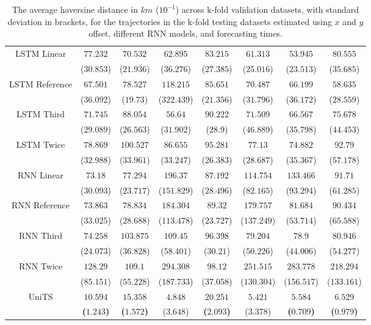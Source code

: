 \begin{table}[!ht]
{\begin{tabular}{|c|c|c|c|c|c|c|c|}
			\multirow{2}{*}{LSTM Linear} & $77.232$ & $70.532$ & $62.895$ & $83.215$ & $61.313$ & $53.945$ & $80.555$ \\
			 & ($30.853$) & ($21.936$) & ($36.276$) & ($27.385$) & ($25.016$) & ($23.513$) & ($35.685$) \\ \hline
			\multirow{2}{*}{LSTM Reference} & $67.501$ & $78.527$ & $118.215$ & $85.651$ & $70.487$ & $66.199$ & $58.635$ \\
			 & ($36.092$) & ($19.73$) & ($322.439$) & ($21.356$) & ($31.796$) & ($36.172$) & ($28.559$) \\ \hline
			\multirow{2}{*}{LSTM Third} & $71.745$ & $88.054$ & $56.64$ & $90.222$ & $71.509$ & $66.567$ & $75.678$ \\
			 & ($29.089$) & ($26.563$) & ($31.902$) & ($28.9$) & ($46.889$) & ($35.798$) & ($44.453$) \\ \hline
			\multirow{2}{*}{LSTM Twice} & $78.869$ & $100.527$ & $86.655$ & $95.281$ & $77.13$ & $74.882$ & $92.79$ \\
			 & ($32.988$) & ($33.961$) & ($33.247$) & ($26.383$) & ($28.687$) & ($35.367$) & ($57.178$) \\ \hline
			\multirow{2}{*}{RNN Linear} & $73.18$ & $77.294$ & $196.37$ & $87.192$ & $114.754$ & $133.466$ & $91.71$ \\
			 & ($30.093$) & ($23.717$) & ($151.829$) & ($28.496$) & ($82.165$) & ($93.294$) & ($61.285$) \\ \hline
			\multirow{2}{*}{RNN Reference} & $73.863$ & $78.834$ & $184.304$ & $89.32$ & $179.757$ & $81.684$ & $90.434$ \\
			 & ($33.025$) & ($28.688$) & ($113.478$) & ($23.727$) & ($137.249$) & ($53.714$) & ($65.588$) \\ \hline
			\multirow{2}{*}{RNN Third} & $74.258$ & $103.875$ & $109.45$ & $96.398$ & $79.204$ & $78.9$ & $80.946$ \\
			 & ($24.073$) & ($36.828$) & ($58.401$) & ($30.21$) & ($50.226$) & ($44.006$) & ($54.277$) \\ \hline
			\multirow{2}{*}{RNN Twice} & $128.29$ & $109.1$ & $294.308$ & $98.12$ & $251.515$ & $283.778$ & $218.294$ \\
			 & ($85.151$) & ($55.228$) & ($187.733$) & ($37.058$) & ($130.304$) & ($156.517$) & ($133.161$) \\ \hline
			\multirow{2}{*}{UniTS} & $\mathbf{10.594}$ & $\mathbf{15.358}$ & $4.848$ & $\mathbf{20.251}$ & $5.421$ & $\mathbf{5.584}$ & $\mathbf{6.529}$ \\
			 & \textbf{(}$\mathbf{1.243}$\textbf{)} & \textbf{(}$\mathbf{1.572}$\textbf{)} & ($3.648$) & \textbf{(}$\mathbf{2.093}$\textbf{)} & ($3.378$) & \textbf{(}$\mathbf{0.709}$\textbf{)} & \textbf{(}$\mathbf{0.979}$\textbf{)} \\ \hline
		\end{tabular}
	}
	\caption{The average haversine distance in $km$ ($10^{-1}$) across k-fold validation datasets, with standard deviation in brackets, for the trajectories in the k-fold testing datasets estimated using $x$ and $y$ offset, different RNN models, and forecasting times.}
	\label{tab:all_no_abs_haversine}
\end{table}

